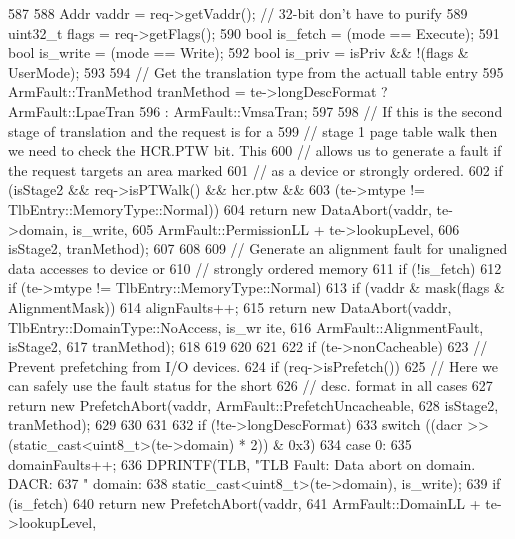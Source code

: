 \begin{DoxyCode}
587 {
588     Addr vaddr = req->getVaddr(); // 32-bit don't have to purify
589     uint32_t flags = req->getFlags();
590     bool is_fetch  = (mode == Execute);
591     bool is_write  = (mode == Write);
592     bool is_priv   = isPriv && !(flags & UserMode);
593 
594     // Get the translation type from the actuall table entry
595     ArmFault::TranMethod tranMethod = te->longDescFormat ? ArmFault::LpaeTran
596                                                          : ArmFault::VmsaTran;
597 
598     // If this is the second stage of translation and the request is for a
599     // stage 1 page table walk then we need to check the HCR.PTW bit. This
600     // allows us to generate a fault if the request targets an area marked
601     // as a device or strongly ordered.
602     if (isStage2 && req->isPTWalk() && hcr.ptw &&
603         (te->mtype != TlbEntry::MemoryType::Normal)) {
604         return new DataAbort(vaddr, te->domain, is_write,
605                              ArmFault::PermissionLL + te->lookupLevel,
606                              isStage2, tranMethod);
607     }
608 
609     // Generate an alignment fault for unaligned data accesses to device or
610     // strongly ordered memory
611     if (!is_fetch) {
612         if (te->mtype != TlbEntry::MemoryType::Normal) {
613             if (vaddr & mask(flags & AlignmentMask)) {
614                 alignFaults++;
615                 return new DataAbort(vaddr, TlbEntry::DomainType::NoAccess, is_wr
      ite,
616                                      ArmFault::AlignmentFault, isStage2,
617                                      tranMethod);
618             }
619         }
620     }
621 
622     if (te->nonCacheable) {
623         // Prevent prefetching from I/O devices.
624         if (req->isPrefetch()) {
625             // Here we can safely use the fault status for the short
626             // desc. format in all cases
627             return new PrefetchAbort(vaddr, ArmFault::PrefetchUncacheable,
628                                      isStage2, tranMethod);
629         }
630     }
631 
632     if (!te->longDescFormat) {
633         switch ((dacr >> (static_cast<uint8_t>(te->domain) * 2)) & 0x3) {
634           case 0:
635             domainFaults++;
636             DPRINTF(TLB, "TLB Fault: Data abort on domain. DACR: %
637                     " domain: %
638                     static_cast<uint8_t>(te->domain), is_write);
639             if (is_fetch)
640                 return new PrefetchAbort(vaddr,
641                                          ArmFault::DomainLL + te->lookupLevel,
}}}
\end{DoxyCode}
